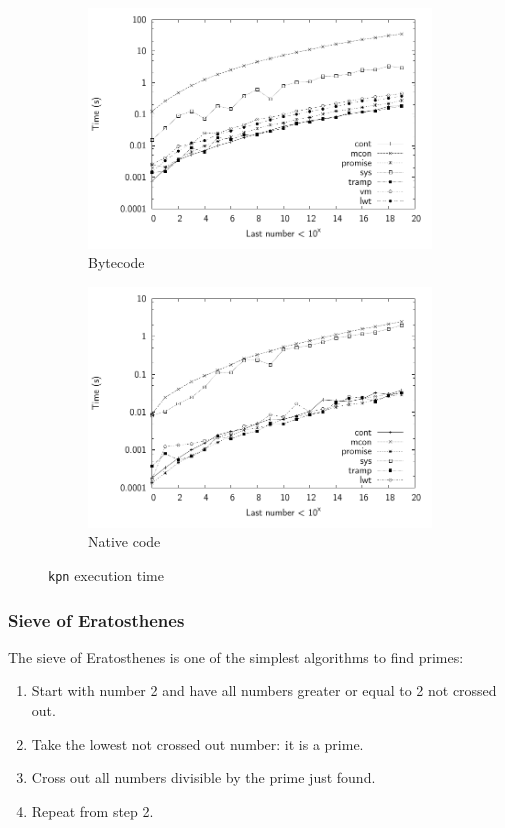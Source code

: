 \documentclass[12pt,twoside,notitlepage]{report}
\theoremstyle{plain}%
\theoremstyle{definition}
\theoremstyle{remark}
\begin{document}
\begin{figure}
\centering
\begin{subfigure}[b]{0.45\linewidth}
\includegraphics[width=\linewidth]{./kpn_exec_times_bw}
\caption{Bytecode}
\label{fig:kpn_exec_times_bc}
\end{subfigure}
\begin{subfigure}[b]{0.45\linewidth}
\includegraphics[width=\linewidth]{./kpn_exec_times_opt_bw}
\caption{Native code}
\label{fig:kpn_exec_times_nat}
\end{subfigure}
\cprotect\caption{\verb|kpn| execution time}
\label{fig:kpn_exec_times}
\end{figure}



\subsubsection{Sieve of Eratosthenes}
The sieve of Eratosthenes is one of the simplest algorithms to find primes:
\begin{enumerate}
\item{Start with number 2 and have all numbers greater or equal to 2 not crossed out.}
\item{Take the lowest not crossed out number: it is a prime.}
\item{Cross out all numbers divisible by the prime just found.}
\item{Repeat from step 2.}
\end{enumerate}
\end{document}
